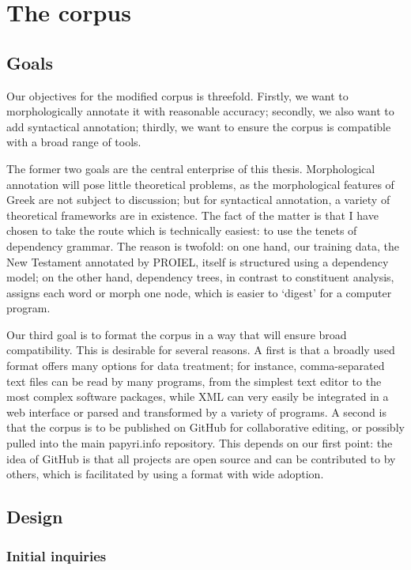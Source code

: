 \chapter{The corpus}
\label{chp:design}
\minitoc\mtcskip
\section{Goals}

Our objectives for the modified corpus is threefold. Firstly, we want to
morphologically annotate it with reasonable accuracy; secondly, we also want to
add syntactical annotation; thirdly, we want to ensure the corpus is compatible
with a broad range of tools.

The former two goals are the central enterprise of this thesis. Morphological
annotation will pose little theoretical problems, as the morphological features
of Greek are not subject to discussion; but for syntactical annotation, a
variety of theoretical frameworks are in existence. The fact of the matter is
that I have chosen to take the route which is technically easiest: to use the
tenets of dependency grammar. The reason is twofold: on one hand, our training
data, the New Testament annotated by PROIEL, itself is structured using a
dependency model; on the other hand, dependency trees, in contrast to
constituent analysis, assigns each word or morph one node, which is easier to
`digest' for a computer program.

Our third goal is to format the corpus in a way that will ensure broad
compatibility. This is desirable for several reasons. A first is that a broadly
used format offers many options for data treatment; for instance,
comma-separated text files can be read by many programs, from the simplest text
editor to the most complex software packages, while XML can very easily be
integrated in a web interface or parsed and transformed by a variety of
programs. A second is that the corpus is to be published on GitHub for
collaborative editing, or possibly pulled into the main papyri.info repository.
This depends on our first point: the idea of GitHub is that all projects are
open source and can be contributed to by others, which is facilitated by using
a format with wide adoption.

\section{Design}
\subsection{Initial inquiries}

